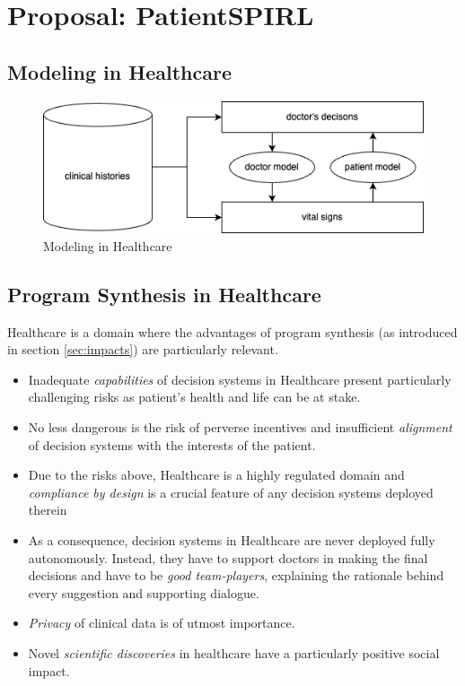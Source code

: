 \chapter{Proposal: PatientSPIRL}
\label{ch:proposal}

\section{Modeling in Healthcare}

\begin{figure}
  \centering
  \includegraphics[width=0.8\linewidth]{images/PatientModeling.drawio.png}
  \caption{Modeling in Healthcare}
  \label{fig:modelhealth}
\end{figure}


\newpage
\section{Program Synthesis in Healthcare}


Healthcare is a domain where the advantages of program synthesis (as introduced in section \ref{sec:impacts}) are particularly relevant.
\begin{itemize}
    \item Inadequate \emph{capabilities} of decision systems in Healthcare present particularly challenging risks as patient's health and life can be at stake.
    \item No less dangerous is the risk of perverse incentives and insufficient \emph{alignment} of decision systems with the interests of the patient.
    \item Due to the risks above, Healthcare is a highly regulated domain and \emph{compliance by design} is a crucial feature of any decision systems deployed therein
    \item As a consequence, decision systems in Healthcare are never deployed fully autonomously. Instead, they have to support doctors in making the final decisions and have to be \emph{good team-players}, explaining the rationale behind every suggestion and supporting dialogue.
    \item \emph{Privacy} of clinical data is of utmost importance.
    \item Novel \emph{scientific discoveries} in healthcare have a particularly positive social impact.
\end{itemize}

